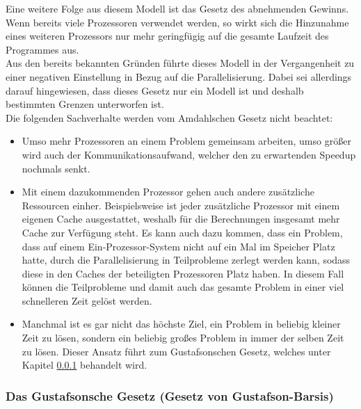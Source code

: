 				Eine weitere Folge aus diesem Modell ist das Gesetz des abnehmenden Gewinns. Wenn bereits viele Prozessoren verwendet werden, so wirkt sich die Hinzunahme eines weiteren Prozessors nur mehr geringfügig auf die gesamte Laufzeit des Programmes aus.\\
				
				Aus den bereits bekannten Gründen führte dieses Modell in der Vergangenheit zu einer negativen Einstellung in Bezug auf die Parallelisierung. Dabei sei allerdings darauf hingewiesen, dass dieses Gesetz nur ein Modell ist und deshalb bestimmten Grenzen unterworfen ist.\\
				Die folgenden Sachverhalte werden vom Amdahlschen Gesetz nicht beachtet:
				
				\begin{itemize}
					\item Umso mehr Prozessoren an einem Problem gemeinsam arbeiten, umso größer wird auch der Kommunikationsaufwand, welcher den zu erwartenden Speedup nochmals senkt.
					\item Mit einem dazukommenden Prozessor gehen auch andere zusätzliche Ressourcen einher. Beispielsweise ist jeder zusätzliche Prozessor mit einem eigenen Cache ausgestattet, weshalb für die Berechnungen insgesamt mehr Cache zur Verfügung steht. Es kann auch dazu kommen, dass ein Problem, dass auf einem Ein-Prozessor-System nicht auf ein Mal im Speicher Platz hatte, durch die Parallelisierung in Teilprobleme zerlegt werden kann, sodass diese in den Caches der beteiligten Prozessoren Platz haben. In diesem Fall können die Teilprobleme und damit auch das gesamte Problem in einer viel schnelleren Zeit gelöst werden.
					\item Manchmal ist es gar nicht das höchste Ziel, ein Problem in beliebig kleiner Zeit zu lösen, sondern ein beliebig großes Problem in immer der selben Zeit zu lösen. Dieser Ansatz führt zum Gustafsonschen Gesetz, welches unter Kapitel \ref{GustafsonschesGesetz} behandelt wird. \cite{AmdahlschesGesetzWikipedia} \cite{GesetzeParallelierung}
				\end{itemize}

			\subsubsection{Das Gustafsonsche Gesetz (Gesetz von Gustafson-Barsis)}
				\label{GustafsonschesGesetz}
				
